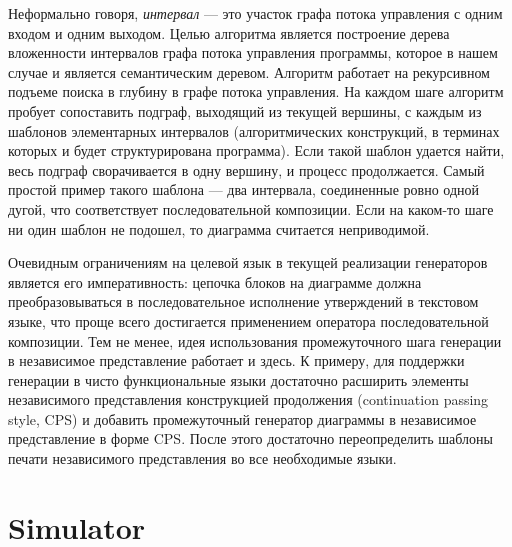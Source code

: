 \documentclass[conference]{IEEEtran}
\begin{document}
Неформально говоря, \textit{интервал} --- это участок графа потока управления с одним входом и одним выходом. Целью алгоритма является построение дерева вложенности интервалов графа потока управления программы, которое в нашем случае и является семантическим деревом. Алгоритм работает на рекурсивном подъеме поиска в глубину в графе потока управления. На каждом шаге алгоритм пробует сопоставить подграф, выходящий из текущей вершины, с каждым из шаблонов элементарных интервалов (алгоритмических конструкций, в терминах которых и будет структурирована программа). Если такой шаблон удается найти, весь подграф сворачивается в одну вершину, и процесс продолжается. Самый простой пример такого шаблона --- два интервала, соединенные ровно одной дугой, что соответствует последовательной композиции. Если на каком-то шаге ни один шаблон не подошел, то диаграмма считается неприводимой.

Очевидным ограничениям на целевой язык в текущей реализации генераторов является его императивность: цепочка блоков на диаграмме должна преобразовываться в последовательное исполнение утверждений в текстовом языке, что проще всего достигается применением оператора последовательной композиции. Тем не менее, идея использования промежуточного шага генерации в независимое представление работает и здесь. К примеру, для поддержки генерации в чисто функциональные языки достаточно расширить элементы независимого представления конструкцией продолжения (continuation passing style, CPS) и добавить промежуточный генератор диаграммы в независимое представление в форме CPS. После этого достаточно переопределить шаблоны печати независимого представления во все необходимые языки.

\section{Simulator}
\label{chapter:2dModel}
\end{document}
